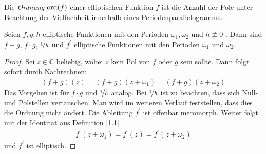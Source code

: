 \begin{df}\label{1.3}%
Die \textit{Ordnung} $\operatorname{ord}(f)$ einer elliptischen Funktion $f$ ist die Anzahl der Pole unter Beachtung der Vielfachheit innerhalb eines Periodenparallelogramms.
\end{df}

\begin{sz}\label{1.4}
Seien $f,g,h$ elliptische Funktionen mit den Perioden $\omega_1, \omega_2$ und $ h\nequiv 0$ .
Dann sind $f + g$, $f \cdot g$, $\nicefrac{1}{h}$ und $f^\prime$ elliptische Funktionen mit den Perioden $\omega_1$ und $\omega_2$.
\end{sz}

\begin{proof}
Sei $z \in \mathbb{C}$ beliebig, wobei $z$ kein Pol von $f$ oder $g$ sein sollte.
Dann folgt sofort durch Nachrechnen:
\begin{align*}
(f+g)(z) = (f+g)(z+\omega_1)= (f+g)(z+\omega_2)
\end{align*}
Das Vorgehen ist für $f \cdot g$ und  $\nicefrac{1}{h}$ analog.
Bei $\nicefrac{1}{h}$ ist zu beachten, dass sich Null- und Polstellen vertauschen.
Man wird im weiteren Verlauf feststellen, dass dies die Ordnung nicht ändert.
Die Ableitung $f^\prime$ ist offenbar meromorph.
Weiter folgt mit der Identität aus Definition \ref{1.1} 
\begin{align*}
f^\prime(z+\omega_1) = f^\prime(z) = f^\prime(z+\omega_2) 
\end{align*}
und $f^\prime$ ist elliptisch.
\end{proof}

